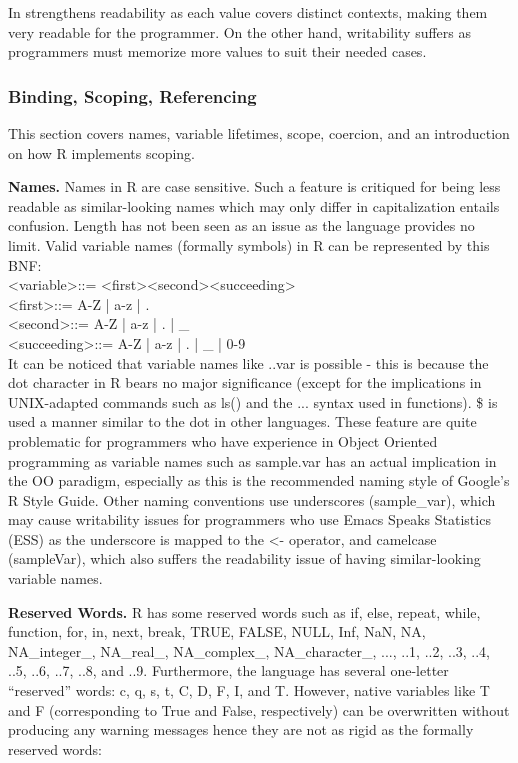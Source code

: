 \documentclass[12pt]{article}
\begin{document}
In strengthens readability as each value covers distinct contexts, making them very readable for the programmer. On the other hand, writability suffers as programmers must memorize more values to suit their needed cases.

\subsubsection{Binding, Scoping, Referencing}

This section covers names, variable lifetimes, scope, coercion, and an introduction on how R implements scoping.

\textbf{Names.} Names in R are case sensitive. Such a feature is critiqued for being less readable as similar-looking names which may only differ in capitalization entails confusion. Length has not been seen as an issue as the language provides no limit. Valid variable names (formally symbols) in R can be represented by this BNF: \\
\textless variable\textgreater ::= \textless first\textgreater \textless second\textgreater \textless succeeding\textgreater* \\
\textless first\textgreater ::= A-Z | a-z | . \\
\textless second\textgreater ::= A-Z | a-z | . | \_ \\
\textless succeeding\textgreater ::= A-Z | a-z | . | \_ | 0-9 \\

It can be noticed that variable names like ..var is possible - this is because the dot character in R bears no major significance (except for the implications in UNIX-adapted commands such as ls() and the ... syntax used in functions). \$ is used a manner similar to the dot in other languages. These feature are quite problematic for programmers who have experience in Object Oriented programming as variable names such as sample.var has an actual implication in the OO paradigm, especially as this is the recommended naming style of Google's R Style Guide. Other naming conventions use underscores (sample\_var), which may cause writability issues for programmers who use Emacs Speaks Statistics (ESS) as the underscore is mapped to the <- operator, and camelcase (sampleVar), which also suffers the readability issue of having similar-looking variable names.


\textbf{Reserved Words.} R has some reserved words such as if, else, repeat, while, function, for, in, next, break, TRUE, FALSE, NULL, Inf, NaN, NA, NA\_integer\_, NA\_real\_, NA\_complex\_, NA\_character\_, ..., ..1, ..2, ..3, ..4, ..5, ..6, ..7, ..8, and ..9. Furthermore, the language has several one-letter ``reserved'' words: c, q, s, t, C, D, F, I, and T. However, native variables like T and F (corresponding to True and False, respectively) can be overwritten without producing any warning messages hence they are not as rigid as the formally reserved words:
\end{document}
